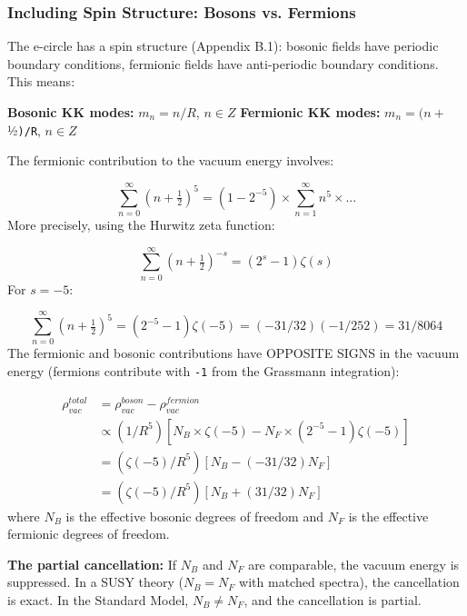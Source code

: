 \documentclass[aps,prd,preprint,superscriptaddress,longbibliography,floatfix]{revtex4-2}
\theoremstyle{remark}
\begin{document}
\subsubsection{Including Spin Structure: Bosons vs. Fermions}

The e-circle has a spin structure (Appendix B.1): bosonic fields have periodic boundary conditions, fermionic fields have anti-periodic boundary conditions. This means:

\textbf{Bosonic KK modes:} $m_{n} = n/R$, $n \in Z$ \textbf{Fermionic KK modes:} $m_{n} = (n + $½\texttt{)/R}, $n \in Z$

The fermionic contribution to the vacuum energy involves:


\begin{equation}
    \sum_{n=0}^{\infty} (n + \tfrac{1}{2})^{5} = (1 - 2^{-5}) \times \sum_{n=1}^{\infty} n^{5} \times ...
\end{equation}
More precisely, using the Hurwitz zeta function:


\begin{equation}
    \sum_{n=0}^{\infty} (n + \tfrac{1}{2})^{-s} = (2^s - 1) \zeta(s)
\end{equation}
For $s = -5$:


\begin{equation}
    \sum_{n=0}^{\infty} (n + \tfrac{1}{2})^{5} = (2^{-5} - 1) \zeta(-5) = (-31/32)(-1/252) = 31/8064
\end{equation}
The fermionic and bosonic contributions have OPPOSITE SIGNS in the vacuum energy (fermions contribute with \texttt{-1} from the Grassmann integration):


\begin{align}
    \rho_{vac}^{total} &= \rho_{vac}^{boson} - \rho_{vac}^{fermion} \\
    & \propto (1/R^{5}) [N_B \times \zeta(-5) - N_F \times (2^{-5} - 1) \zeta(-5)] \\
    & = (\zeta(-5)/R^{5}) [N_B - (-31/32) N_F] \\
    & = (\zeta(-5)/R^{5}) [N_B + (31/32) N_F]
\end{align}
where $N_B$ is the effective bosonic degrees of freedom and $N_F$ is the effective fermionic degrees of freedom.

\textbf{The partial cancellation:} If $N_B$ and $N_F$ are comparable, the vacuum energy is suppressed. In a SUSY theory ($N_B = N_F$ with matched spectra), the cancellation is exact. In the Standard Model, $N_B \neq N_F$, and the cancellation is partial.
\end{document}
